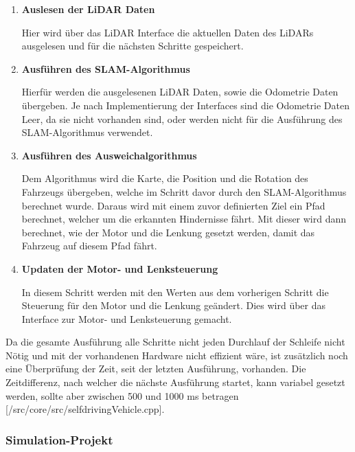 \begin{enumerate}[leftmargin=*]

    \item \textbf{Auslesen der LiDAR Daten}

    Hier wird über das LiDAR Interface die aktuellen Daten des LiDARs ausgelesen und für die nächsten Schritte gespeichert.

    \item \textbf{Ausführen des SLAM-Algorithmus} 
    
    Hierfür werden die ausgelesenen LiDAR Daten, sowie die Odometrie Daten übergeben. Je nach Implementierung der Interfaces sind die Odometrie Daten Leer, da sie nicht vorhanden sind, oder werden nicht für die Ausführung des SLAM-Algorithmus verwendet. 

    \item \textbf{Ausführen des Ausweichalgorithmus}
    
    Dem Algorithmus wird die Karte, die Position und die Rotation des Fahrzeugs übergeben, welche im Schritt davor durch den SLAM-Algorithmus berechnet wurde. Daraus wird mit einem zuvor definierten Ziel ein Pfad berechnet, welcher um die erkannten Hindernisse fährt. Mit dieser wird dann berechnet, wie der Motor und die Lenkung gesetzt werden, damit das Fahrzeug auf diesem Pfad fährt. 

    \item \textbf{Updaten der Motor- und Lenksteuerung} 

    In diesem Schritt werden mit den Werten aus dem vorherigen Schritt die Steuerung für den Motor und die Lenkung geändert. Dies wird über das Interface zur Motor- und Lenksteuerung gemacht. 

\end{enumerate}

Da die gesamte Ausführung alle Schritte nicht jeden Durchlauf der Schleife nicht Nötig und mit der vorhandenen Hardware nicht effizient wäre, ist zusätzlich noch eine Überprüfung der Zeit, seit der letzten Ausführung, vorhanden. Die Zeitdifferenz, nach welcher die nächste Ausführung startet, kann variabel gesetzt werden, sollte aber zwischen 500 und 1000 ms betragen [/src/core/src/selfdrivingVehicle.cpp]. 

\subsubsection{Simulation-Projekt}

